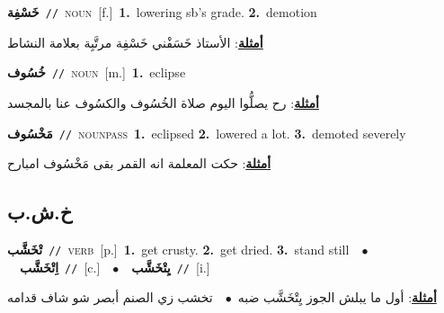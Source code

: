 \documentclass[10pt,a4paper,twoside]{article} %
\begin{document}
\begin{multicols}{2}
{\setlength\topsep{0pt}\textbf{\foreignlanguage{arabic}{خَسْفِة}}\ {\color{gray}\texttt{//}\color{black}}\ \textsc{noun}\ [f.]\ \textbf{1.}~lowering sb's grade.  \textbf{2.}~demotion\  \begin{flushright}\color{gray}\foreignlanguage{arabic}{\textbf{\underline{\foreignlanguage{arabic}{أمثلة}}}: الأستاذ خَسَفْني خَسْفِة مرتَّبِة بعلامة النشاط}\end{flushright}\color{black}} \vspace{2mm}

{\setlength\topsep{0pt}\textbf{\foreignlanguage{arabic}{خُسُوف}}\ {\color{gray}\texttt{//}\color{black}}\ \textsc{noun}\ [m.]\ \textbf{1.}~eclipse\  \begin{flushright}\color{gray}\foreignlanguage{arabic}{\textbf{\underline{\foreignlanguage{arabic}{أمثلة}}}: رح يصلُّوا اليوم صلاة الخُسُوف والكسُوف عنا بالمجسد}\end{flushright}\color{black}} \vspace{2mm}

{\setlength\topsep{0pt}\textbf{\foreignlanguage{arabic}{مَخْسُوف}}\ {\color{gray}\texttt{//}\color{black}}\ \textsc{noun\textunderscore pass}\ \textbf{1.}~eclipsed  \textbf{2.}~lowered a lot.  \textbf{3.}~demoted severely\  \begin{flushright}\color{gray}\foreignlanguage{arabic}{\textbf{\underline{\foreignlanguage{arabic}{أمثلة}}}: حكت المعلمة انه القمر بقى مَخْسُوف امبارح}\end{flushright}\color{black}} \vspace{2mm}

\vspace{-3mm}
\subsection*{\color{blue}\foreignlanguage{arabic}{خ.ش.ب}\color{blue}{}} 

{\setlength\topsep{0pt}\textbf{\foreignlanguage{arabic}{تْخَشَّب}}\ {\color{gray}\texttt{//}\color{black}}\ \textsc{verb}\ [p.]\ \textbf{1.}~get crusty.  \textbf{2.}~get dried.  \textbf{3.}~stand still\ \ $\bullet$\ \ \setlength\topsep{0pt}\textbf{\foreignlanguage{arabic}{اِتْخَشَّب}}\ {\color{gray}\texttt{//}\color{black}}\ [c.]\ \ $\bullet$\ \ \setlength\topsep{0pt}\textbf{\foreignlanguage{arabic}{يِتْخَشَّب}}\ {\color{gray}\texttt{//}\color{black}}\ [i.]\  \begin{flushright}\color{gray}\foreignlanguage{arabic}{\textbf{\underline{\foreignlanguage{arabic}{أمثلة}}}: أول ما يبلش الجوز يِتْخَشَّب ضبه\ $\bullet$\ \  تخشب زي الصنم أبصر شو شاف قدامه}\end{flushright}\color{black}} \vspace{2mm}


\end{multicols}
\end{document}
